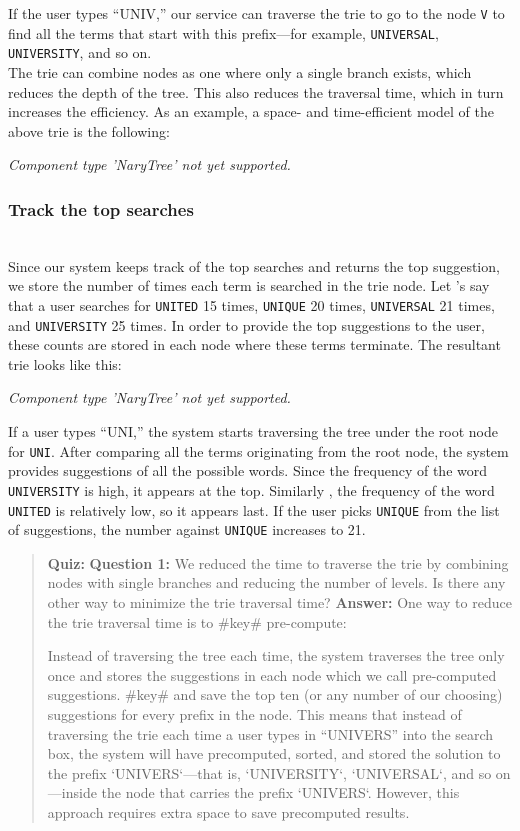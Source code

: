 If the user types ``UNIV,'' our service can traverse the trie to go to the node \texttt{V} to find all the terms that start with this prefix---for example, \texttt{UNIVERSAL}, \texttt{UNIVERSITY}, and so on.
\\
The trie can combine nodes as one where only a single branch exists, which reduces the depth of the tree. This also reduces the traversal time, which in turn increases the efficiency. As an example, a space- and time-efficient model of the above trie is the following:

\textit{Component type 'NaryTree' not yet supported.}

\subsubsection{Track the top searches}\label{XzP1kPxxhDQMowFVaTWEl}
\\
Since our system keeps track of the top searches and returns the top suggestion, we store the number of times each term is searched in the trie node. Let 's say that a user searches for \texttt{UNITED} 15 times, \texttt{UNIQUE} 20 times, \texttt{UNIVERSAL} 21 times, and \texttt{UNIVERSITY} 25 times. In order to provide the top suggestions to the user, these counts are stored in each node where these terms terminate. The resultant trie looks like this:

\textit{Component type 'NaryTree' not yet supported.}

If a user types ``UNI,'' the system starts traversing the tree under the root node for \texttt{UNI}. After comparing all the terms originating from the root node, the system provides suggestions of all the possible words. Since the frequency of the word \texttt{UNIVERSITY} is high, it appears at the top. Similarly , the frequency of the word \texttt{UNITED} is relatively low, so it appears last. If the user picks \texttt{UNIQUE} from the list of suggestions, the number against \texttt{UNIQUE} increases to 21.

\begin{quote}
\textbf{Quiz:}
\textbf{Question 1:} We reduced the time to traverse the trie by combining nodes with single branches and reducing the number of levels. Is there any other way to minimize the trie traversal time?
\textbf{Answer:} One way to reduce the trie traversal time is to \#key\# pre-compute:

Instead of traversing the tree each time, the system traverses the tree only once and stores the suggestions in each node which we call pre-computed suggestions. \#key\# and save the top ten (or any number of our choosing) suggestions for every prefix in the node. This means that instead of traversing the trie each time a user types in ``UNIVERS'' into the search box, the system will have precomputed, sorted, and stored the solution to the prefix `UNIVERS`---that is, `UNIVERSITY`,
`UNIVERSAL`, and so on---inside the node that carries the prefix `UNIVERS`. However, this approach requires extra space to save precomputed results.

\end{quote}

